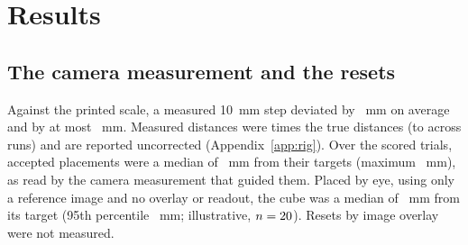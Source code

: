 %
\section{Results}
\label{sec:results}

\subsection{The camera measurement and the resets}
\label{sec:instrument}
Against the printed scale, a measured 10~mm step deviated by \instrumentMeanAbsError~mm on average and by at most \instrumentMaxStepError~mm. %
Measured distances were \scaleFactor times the true distances (\scaleFactorMin to \scaleFactorMax across runs) and are reported uncorrected (Appendix~\ref{app:rig}).
Over the \nTrialsTotal scored trials, accepted placements were a median of \resetErrorMedian~mm from their targets (maximum \resetErrorMax~mm), as read by the camera measurement that guided them.
Placed by eye, using only a reference image and no overlay or readout, the cube was a median of \byEyeErrorMedian~mm from its target (95th percentile \byEyeErrorNinetyFive~mm; illustrative, $n=20$). %
Resets by image overlay \cite{kressgazit2024robot,tri2025careful,huang2026vlareplica} were not measured.

